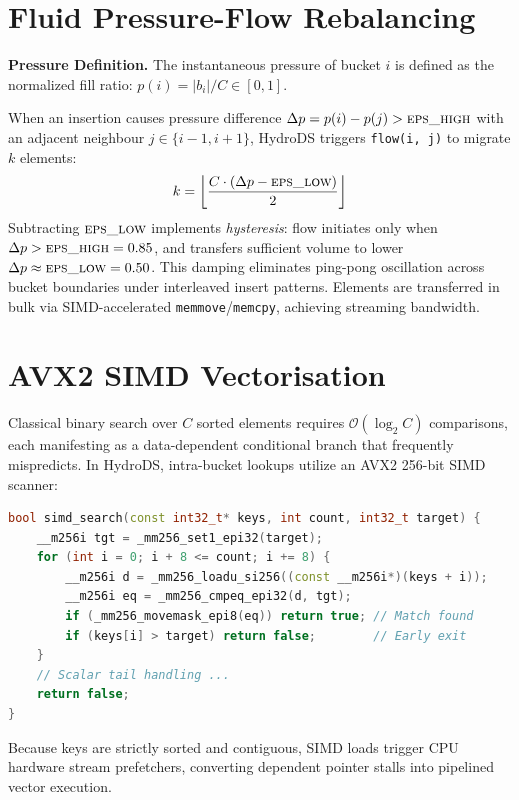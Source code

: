 \documentclass[10pt,twocolumn,letterpaper]{article}
\theoremstyle{definition}
\newcommand{\codeword}[1]{\texttt{\scriptsize #1}}
\newcommand{\epsh}{\textsc{eps\_high}}
\newcommand{\epsl}{\textsc{eps\_low}}
\newcommand{\BigO}[1]{\mathcal{O}(#1)}
\begin{document}
\section{Fluid Pressure-Flow Rebalancing}
\label{sec:pressure}

\noindent\textbf{Pressure Definition.}
The instantaneous pressure of bucket $i$ is defined as the normalized fill ratio: $p(i) = |b_i| / C \in [0, 1]$.

When an insertion causes pressure difference $\Delta p = p(i) - p(j) > \epsh$ with an adjacent neighbour $j \in \{i-1, i+1\}$, HydroDS triggers \codeword{flow(i, j)} to migrate $k$ elements:
\begin{equation}
  k = \left\lfloor \frac{C \cdot (\Delta p - \epsl)}{2} \right\rfloor
\end{equation}
Subtracting $\epsl$ implements \emph{hysteresis}: flow initiates only when $\Delta p > \epsh = 0.85$, and transfers sufficient volume to lower $\Delta p \approx \epsl = 0.50$. This damping eliminates ping-pong oscillation across bucket boundaries under interleaved insert patterns. Elements are transferred in bulk via SIMD-accelerated \texttt{memmove}/\texttt{memcpy}, achieving streaming bandwidth.

\section{AVX2 SIMD Vectorisation}
\label{sec:simd}

Classical binary search over $C$ sorted elements requires $\BigO{\log_2 C}$ comparisons, each manifesting as a data-dependent conditional branch that frequently mispredicts. In HydroDS, intra-bucket lookups utilize an AVX2 256-bit SIMD scanner:

\begin{lstlisting}[language=C++]
bool simd_search(const int32_t* keys, int count, int32_t target) {
    __m256i tgt = _mm256_set1_epi32(target);
    for (int i = 0; i + 8 <= count; i += 8) {
        __m256i d = _mm256_loadu_si256((const __m256i*)(keys + i));
        __m256i eq = _mm256_cmpeq_epi32(d, tgt);
        if (_mm256_movemask_epi8(eq)) return true; // Match found
        if (keys[i] > target) return false;        // Early exit
    }
    // Scalar tail handling ...
    return false;
}
\end{lstlisting}
Because keys are strictly sorted and contiguous, SIMD loads trigger CPU hardware stream prefetchers, converting dependent pointer stalls into pipelined vector execution.
\end{document}
